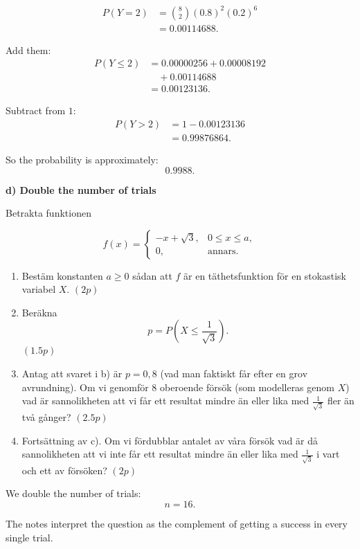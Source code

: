 \documentclass[10pt]{article}
\begin{document}
\begin{align*}
P(Y=2)
&=
\binom{8}{2}
(0.8)^2(0.2)^6
\\[2mm]
&=
0.00114688.
\end{align*}

Add them:
\begin{align*}
P(Y\le 2)
&=
0.00000256
+0.00008192
\\
&\quad
+0.00114688
\\[2mm]
&=
0.00123136.
\end{align*}

Subtract from \(1\):
\begin{align*}
P(Y>2)
&=
1-0.00123136
\\[2mm]
&=
0.99876864.
\end{align*}

So the probability is approximately:
\[
0.9988.
\]

\textbf{d) Double the number of trials}

Betrakta funktionen

\[
f(x)=
\begin{cases}
-x+\sqrt{3},
& 0\le x\le a,\\
0,
& \text{annars}.
\end{cases}
\]

\begin{enumerate}[label=\alph*)]
\item Bestäm konstanten \(a\ge 0\) sådan att
\(f\) är en täthetsfunktion för en stokastisk
variabel \(X\). \((2p)\)

\item Beräkna
\[
p=P\left(X\le \frac{1}{\sqrt{3}}\right).
\]
\((1.5p)\)

\item Antag att svaret i b) är \(p=0,8\)
(vad man faktiskt får efter en grov avrundning).
Om vi genomför 8 oberoende försök
(som modelleras genom \(X\)) vad är sannolikheten
att vi får ett resultat mindre än eller lika med
\(\frac{1}{\sqrt{3}}\) fler än två gånger?
\((2.5p)\)

\item Fortsättning av c). Om vi fördubblar antalet
av våra försök vad är då sannolikheten att vi inte
får ett resultat mindre än eller lika med
\(\frac{1}{\sqrt{3}}\) i vart och ett av försöken?
\((2p)\)
\end{enumerate}

We double the number of trials:
\[
n=16.
\]

The notes interpret the question as the complement
of getting a success in every single trial.
\end{document}

